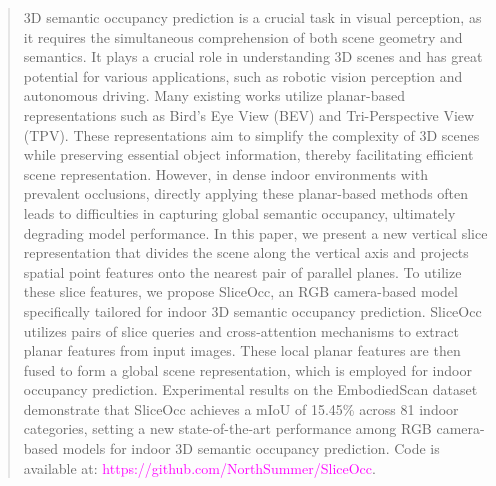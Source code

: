 \documentclass[letterpaper, 10 pt, conference]{ieeeconf}  %
\begin{document}
\begin{abstract}
3D semantic occupancy prediction is a crucial task in visual perception, as it requires the simultaneous comprehension of both scene geometry and semantics. It plays a crucial role in understanding 3D scenes and has great potential for various applications, such as robotic vision perception and autonomous driving. Many existing works utilize planar-based representations such as Bird’s Eye View (BEV) and Tri-Perspective View (TPV). These representations aim to simplify the complexity of 3D scenes while preserving essential object information, thereby facilitating efficient scene representation. However, in dense indoor environments with prevalent occlusions, directly applying these planar-based methods often leads to difficulties in capturing global semantic occupancy, ultimately degrading model performance. In this paper, we present a new vertical slice representation that divides the scene along the vertical axis and projects spatial point features onto the nearest pair of parallel planes. To utilize these slice features, we propose SliceOcc, an RGB camera-based model specifically tailored for indoor 3D semantic occupancy prediction. SliceOcc utilizes pairs of slice queries and cross-attention mechanisms to extract planar features from input images. These local planar features are then fused to form a global scene representation, which is employed for indoor occupancy prediction. Experimental results on the EmbodiedScan dataset demonstrate that SliceOcc achieves a mIoU of 15.45\% across 81 indoor categories, setting a new state-of-the-art performance among RGB camera-based models for indoor 3D semantic occupancy prediction. Code is available at: \textcolor{magenta}{https://github.com/NorthSummer/SliceOcc}.

\end{abstract}



\end{document}
